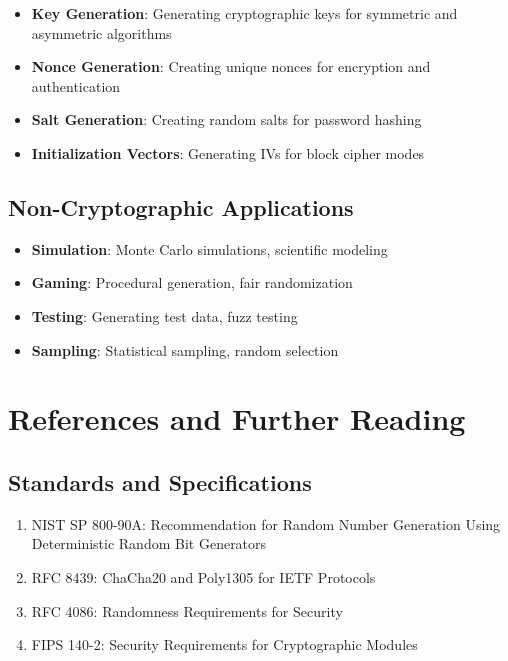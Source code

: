 \documentclass[11pt,a4paper]{article}
\begin{document}
\begin{itemize}
    \item \textbf{Key Generation}: Generating cryptographic keys for symmetric and asymmetric algorithms
    \item \textbf{Nonce Generation}: Creating unique nonces for encryption and authentication
    \item \textbf{Salt Generation}: Creating random salts for password hashing
    \item \textbf{Initialization Vectors}: Generating IVs for block cipher modes
\end{itemize}

\subsection{Non-Cryptographic Applications}

\begin{itemize}
    \item \textbf{Simulation}: Monte Carlo simulations, scientific modeling
    \item \textbf{Gaming}: Procedural generation, fair randomization
    \item \textbf{Testing}: Generating test data, fuzz testing
    \item \textbf{Sampling}: Statistical sampling, random selection
\end{itemize}

\section{References and Further Reading}

\subsection{Standards and Specifications}

\begin{enumerate}
    \item NIST SP 800-90A: Recommendation for Random Number Generation Using Deterministic Random Bit Generators
    \item RFC 8439: ChaCha20 and Poly1305 for IETF Protocols
    \item RFC 4086: Randomness Requirements for Security
    \item FIPS 140-2: Security Requirements for Cryptographic Modules
\end{enumerate}
\end{document}
